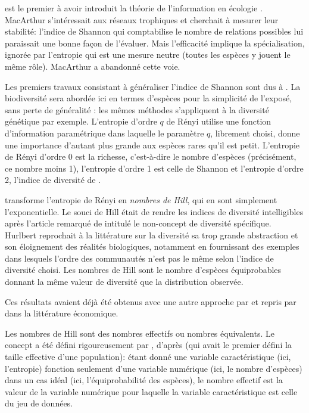 \documentclass[a4paper]{article}
\begin{document}
\cite{MacArthur1955} est le premier à avoir introduit la théorie de l'information en écologie \citep{Ulanowicz2001}.
MacArthur s'intéressait aux réseaux trophiques et cherchait à mesurer leur stabilité: l'indice de Shannon qui comptabilise le nombre de relations possibles lui paraissait une bonne façon de l'évaluer. 
Mais l'efficacité implique la spécialisation, ignorée par l'entropie qui est une mesure neutre (toutes les espèces y jouent le même rôle).
MacArthur a abandonné cette voie.

Les premiers travaux consistant à généraliser l'indice de Shannon sont dus à \cite{Renyi1961}.
La biodiversité sera abordée ici en termes d'espèces pour la simplicité de l'exposé, sans perte de généralité : les mêmes méthodes s'appliquent à la diversité génétique par exemple.
L'entropie d'ordre $q$ de Rényi utilise une fonction d'information paramétrique dans laquelle le paramètre $q$, librement choisi, donne une importance d'autant  plus grande aux espèces rares qu'il est petit.
L'entropie de Rényi d'ordre 0 est la richesse, c'est-à-dire le nombre d'espèces (précisément, ce nombre moins 1), l'entropie d'ordre 1 est celle de Shannon et l'entropie d'ordre 2, l'indice de diversité de \cite{Simpson1949}.

\cite{Hill1973} transforme l'entropie de Rényi en \emph{nombres de Hill}, qui en sont simplement l'exponentielle.
Le souci de Hill était de rendre les indices de diversité intelligibles après l'article remarqué de \cite{Hurlbert1971} intitulé \og le non-concept de diversité spécifique\fg{}.
Hurlbert reprochait à la littérature sur la diversité sa trop grande abstraction et son éloignement des réalités biologiques, notamment en fournissant des exemples dans lesquels l'ordre des communautés n'est pas le même selon l'indice de diversité choisi.
Les nombres de Hill sont le nombre d'espèces équiprobables donnant la même valeur de diversité que la distribution observée.


Ces résultats avaient déjà été obtenus avec une autre approche par \cite{MacArthur1965} et repris par \cite{Adelman1969} dans la littérature économique.

Les nombres de Hill sont des \og nombres effectifs\fg{} ou \og nombres équivalents{}\fg{}.
Le concept a été défini rigoureusement par \cite{Gregorius1991}, d'après \cite{Wright1931} (qui avait le premier défini la taille effective d'une population): étant donné une variable caractéristique (ici, l'entropie) fonction seulement d'une variable numérique (ici, le nombre d'espèces) dans un cas idéal (ici, l'équiprobabilité des espèces), le nombre effectif est la valeur de la variable numérique pour laquelle la variable caractéristique est celle du jeu de données.
\end{document}
